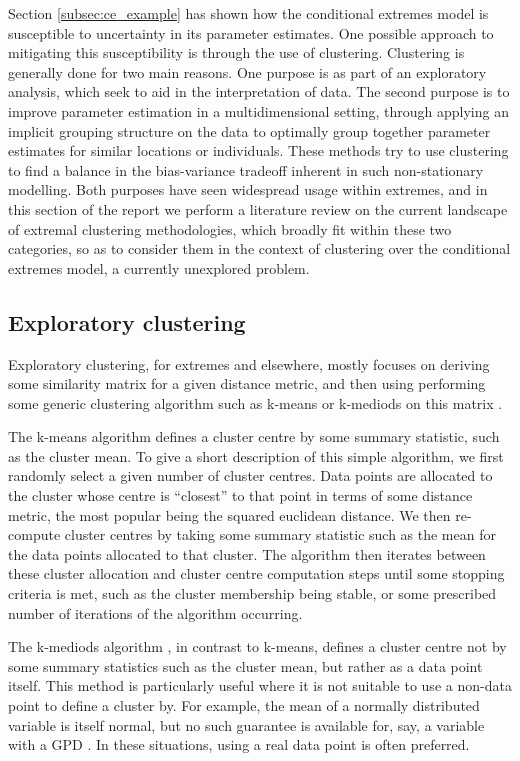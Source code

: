 \documentclass{article}
\numberwithin{equation}{section}
\begin{document}
Section \ref{subsec:ce_example} has shown how the conditional extremes model is susceptible to uncertainty in its parameter estimates. 
One possible approach to mitigating this susceptibility is through the use of clustering. 
Clustering is generally done for two main reasons.
One purpose is as part of an exploratory analysis, which seek to aid in the interpretation of data. 
The second purpose is to improve parameter estimation in a multidimensional setting, through applying an implicit grouping structure on the data to optimally group together parameter estimates for similar locations or individuals. 
These methods try to use clustering to find a balance in the bias-variance tradeoff inherent in such non-stationary modelling. 
Both purposes have seen widespread usage within extremes, and in this section of the report we perform a literature review on the current landscape of extremal clustering methodologies, which broadly fit within these two categories, so as to consider them in the context of clustering over the conditional extremes model, a currently unexplored problem.

\subsection{Exploratory clustering}

Exploratory clustering, for extremes and elsewhere, mostly focuses on deriving some similarity matrix for a given distance metric, and then using performing some generic clustering algorithm such as k-means or k-mediods on this matrix \citet{Lloyd1957} \citet{Kaufman1987}.

The k-means algorithm \citep{Macqueen1967} defines a cluster centre by some summary statistic, such as the cluster mean.
To give a short description of this simple algorithm, we first randomly select a given number of cluster centres.
Data points are allocated to the cluster whose centre is ``closest'' to that point in terms of some distance metric, the most popular being the squared euclidean distance.
We then re-compute cluster centres by taking some summary statistic such as the mean for the data points allocated to that cluster.
The algorithm then iterates between these cluster allocation and cluster centre computation steps until some stopping criteria is met, such as the cluster membership being stable, or some prescribed number of iterations of the algorithm occurring.

The k-mediods algorithm \citep{Kaufman1987}, in contrast to k-means, defines a cluster centre not by some summary statistics such as the cluster mean, but rather as a data point itself.
This method is particularly useful where it is not suitable to use a non-data point to define a cluster by. 
For example, the mean of a normally distributed variable is itself normal, but no such guarantee is available for, say, a variable with a GPD \citep{Vignotto2021}.
In these situations, using a real data point is often preferred.
\end{document}
